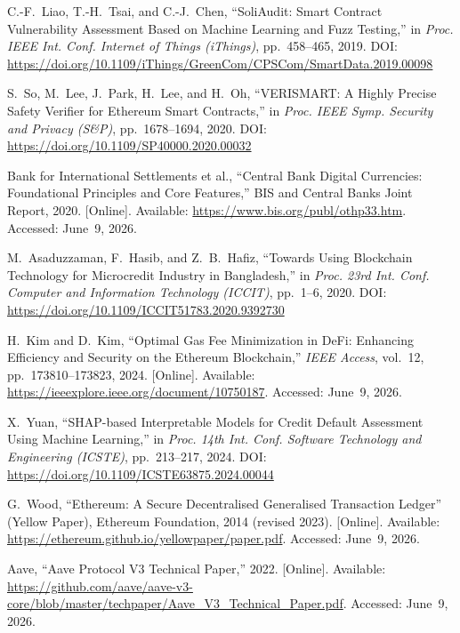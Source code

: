 \documentclass[12pt, a4paper]{report}
\begin{document}
{\begin{enumerate}[label={[\arabic*]}]
\item C.-F.~Liao, T.-H.~Tsai, and C.-J.~Chen, ``SoliAudit: Smart Contract Vulnerability Assessment Based on Machine Learning and Fuzz Testing,'' in \textit{Proc. IEEE Int. Conf. Internet of Things (iThings)}, pp.~458--465, 2019. DOI: \url{https://doi.org/10.1109/iThings/GreenCom/CPSCom/SmartData.2019.00098}

\item S.~So, M.~Lee, J.~Park, H.~Lee, and H.~Oh, ``VERISMART: A Highly Precise Safety Verifier for Ethereum Smart Contracts,'' in \textit{Proc. IEEE Symp. Security and Privacy (S\&P)}, pp.~1678--1694, 2020. DOI: \url{https://doi.org/10.1109/SP40000.2020.00032}

\item Bank for International Settlements et al., ``Central Bank Digital Currencies: Foundational Principles and Core Features,'' BIS and Central Banks Joint Report, 2020. [Online]. Available: \url{https://www.bis.org/publ/othp33.htm}. Accessed: June~9, 2026.

\item M.~Asaduzzaman, F.~Hasib, and Z.~B.~Hafiz, ``Towards Using Blockchain Technology for Microcredit Industry in Bangladesh,'' in \textit{Proc. 23rd Int. Conf. Computer and Information Technology (ICCIT)}, pp.~1--6, 2020. DOI: \url{https://doi.org/10.1109/ICCIT51783.2020.9392730}

\item H.~Kim and D.~Kim, ``Optimal Gas Fee Minimization in DeFi: Enhancing Efficiency and Security on the Ethereum Blockchain,'' \textit{IEEE Access}, vol.~12, pp.~173810--173823, 2024. [Online]. Available: \url{https://ieeexplore.ieee.org/document/10750187}. Accessed: June~9, 2026.

\item X.~Yuan, ``SHAP-based Interpretable Models for Credit Default Assessment Using Machine Learning,'' in \textit{Proc. 14th Int. Conf. Software Technology and Engineering (ICSTE)}, pp.~213--217, 2024. DOI: \url{https://doi.org/10.1109/ICSTE63875.2024.00044}

\item G.~Wood, ``Ethereum: A Secure Decentralised Generalised Transaction Ledger'' (Yellow Paper), Ethereum Foundation, 2014 (revised 2023). [Online]. Available: \url{https://ethereum.github.io/yellowpaper/paper.pdf}. Accessed: June~9, 2026.

\item Aave, ``Aave Protocol V3 Technical Paper,'' 2022. [Online]. Available: \url{https://github.com/aave/aave-v3-core/blob/master/techpaper/Aave_V3_Technical_Paper.pdf}. Accessed: June~9, 2026.


\end{enumerate}}
\end{document}
